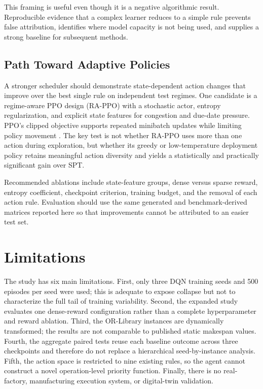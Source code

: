 \documentclass[conference]{IEEEtran}
\newcommand{\method}[1]{\textsc{#1}}
\newcommand{\spt}{\method{SPT}}
\begin{document}
This framing is useful even though it is a negative algorithmic result. Reproducible evidence that a complex learner reduces to a simple rule prevents false attribution, identifies where model capacity is not being used, and supplies a strong baseline for subsequent methods.

\subsection{Path Toward Adaptive Policies}

A stronger scheduler should demonstrate state-dependent action changes that improve over the best single rule on independent test regimes. One candidate is a regime-aware PPO design (RA-PPO) with a stochastic actor, entropy regularization, and explicit state features for congestion and due-date pressure. PPO's clipped objective supports repeated minibatch updates while limiting policy movement \cite{schulman2017ppo}. The key test is not whether RA-PPO uses more than one action during exploration, but whether its greedy or low-temperature deployment policy retains meaningful action diversity and yields a statistically and practically significant gain over \spt.

Recommended ablations include state-feature groups, dense versus sparse reward, entropy coefficient, checkpoint criterion, training budget, and the removal of each action rule. Evaluation should use the same generated and benchmark-derived matrices reported here so that improvements cannot be attributed to an easier test set.

\section{Limitations}

The study has six main limitations. First, only three DQN training seeds and 500 episodes per seed were used; this is adequate to expose collapse but not to characterize the full tail of training variability. Second, the expanded study evaluates one dense-reward configuration rather than a complete hyperparameter and reward ablation. Third, the OR-Library instances are dynamically transformed; the results are not comparable to published static makespan values. Fourth, the aggregate paired tests reuse each baseline outcome across three checkpoints and therefore do not replace a hierarchical seed-by-instance analysis. Fifth, the action space is restricted to nine existing rules, so the agent cannot construct a novel operation-level priority function. Finally, there is no real-factory, manufacturing execution system, or digital-twin validation.
\end{document}
